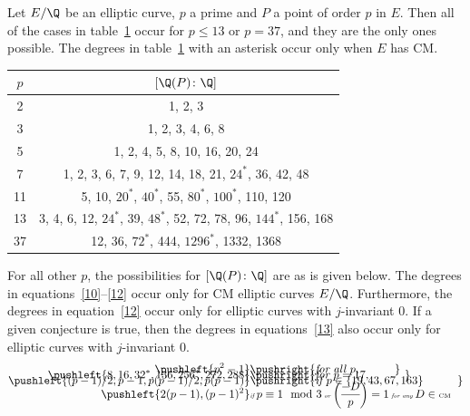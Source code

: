 \begin{frame}[plain]
\tiny
\begin{thm} 
Let $E/\Q$ be an elliptic curve, $p$ a prime and $P$ a point of order $p$ in $E$. Then all of the cases in table~\ref{tab:degreetab} occur for $p \leq 13$ or $p= 37$, and they are the only ones possible. The degrees in table~\ref{tab:degreetab} with an asterisk occur only when $E$ has CM.
	\begin{table}[!ht]
	\centering
	\label{tab:degreetab}
	\begin{tabular}{|c|c|} \hline
	$p$ & $[\Q(P) \colon \Q]$ \\ \hline
	2 & 1, 2, 3 \\ \hline
	3 & 1, 2, 3, 4, 6, 8 \\ \hline
	5 & 1, 2, 4, 5, 8, 10, 16, 20, 24 \\ \hline
	7 & 1, 2, 3, 6, 7, 9, 12, 14, 18, 21, $24^*$, 36, 42, 48 \\ \hline
	11 & 5, 10, $20^*$, $40^*$, 55, $80^*$, $100^*$, 110, 120 \\ \hline
	13 & 3, 4, 6, 12, $24^*$, 39, $48^*$, 52, 72, 78, 96, $144^*$, 156, 168 \\ \hline
	37 & 12, 36, $72^*$, 444, $1296^*$, 1332, 1368 \\ \hline
	\end{tabular}
	\end{table}
For all other $p$, the possibilities for $[\Q(P) \colon \Q]$ are as is given below. The degrees in equations~\ref{10}--\ref{12} occur only for CM elliptic curves $E/\Q$. Furthermore, the degrees in equation~\ref{12} occur only for elliptic curves with $j$-invariant 0. If a given conjecture is true, then the degrees in equations~\ref{13} also occur only for elliptic curves with $j$-invariant 0.
	\begin{align} 
	\pushleft{p^2 - 1} & \pushright{\text{\itshape for all } p,\quad\quad\quad}  \label{8} \\[-1em]
	\pushleft{8, 16, 32^*, 136, 256^*, 272, 288} & \pushright{\text{\itshape for } p= 17,\quad\quad\quad} \label{9} \\[-1em]
	\pushleft{(p - 1)/2, p - 1, p(p - 1)/2, p(p - 1)} & \pushright{\text{\itshape if } p \in \{ 19, 43, 67, 163 \}\quad\quad\quad} \label{10} \\[-1em]
	\pushleft{2(p - 1), (p - 1)^2} & {\small \text{\tiny\itshape if } p \equiv 1 \mod 3 \text{\tiny\itshape\ or } \genfrac(){}{0}{-D}{p}= 1 \text{\tiny\itshape\ for any } D \in \text{\tiny CM} }\label{11} \\[-1em]

\end{align}
\end{thm}
\end{frame}
